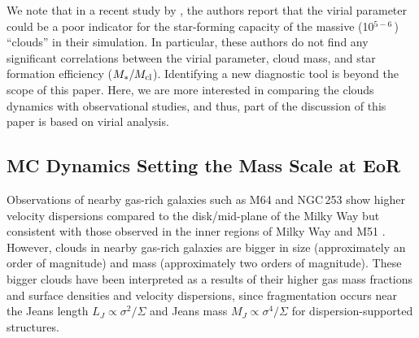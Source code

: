 \IfFileExists{emulateapjlegacy.cls}{\documentclass[iop]{emulateapjlegacy}}{\documentclass[iop]{emulateapj}}
\begin{document}
We note that in a recent study by \citet{Pettitt18a}, the authors report that the virial parameter could be a poor indicator
for the star-forming capacity of the massive (10$^{5-6}$\,\Msun) ``clouds'' in their simulation.
In particular, these authors do not find any significant correlations between the virial parameter, cloud mass,
and star formation efficiency ($M_*/M_{\rm cl}$).
Identifying a new diagnostic tool
is beyond the scope of this paper. Here, we are more interested in
comparing the clouds dynamics with observational studies, and thus,
part of the discussion of this paper is based on virial analysis.


\subsection{MC Dynamics Setting the Mass Scale at EoR} \label{sec:diss3}


Observations of nearby gas-rich galaxies such as M64 and NGC\,253
show higher velocity dispersions compared
to the disk/mid-plane of the Milky Way but consistent with those observed in the inner regions of
Milky Way and M51 \citep{Oka01a, Rosolowsky05a, Heyer09a, Hughes13b, Leroy15a, Rice16a}.  %
However, clouds in nearby gas-rich galaxies are bigger in size (approximately
an order of magnitude) and mass (approximately two orders of magnitude).
These bigger clouds have been interpreted as a results of their 
higher gas mass fractions and
surface densities and velocity dispersions, since
fragmentation occurs near the Jeans length $L_J\propto\sigma^2/\Sigma$
and Jeans mass $M_J\propto\sigma^4/\Sigma$
for dispersion-supported structures.
\end{document}

